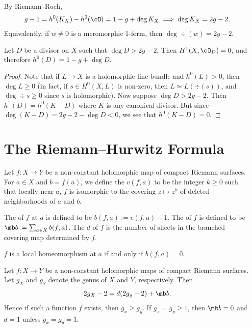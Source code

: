 \documentclass[11pt]{report}
\begin{document}
\begin{cor} \label{cor:deg-1-form-is-2g-2}
By Riemann--Roch,
\[
g-1 = h^0(K_X)-h^0(\cO) = 1-g + \deg K_X \implies \deg K_X = 2g-2,
\]
Equivalently, if $w \neq 0$ is a meromorphic 1-form, then $\deg \div(w)=2g-2$.
\end{cor}

\begin{thm} \label{thm:vanishing-thm}
Let $D$ be a divisor on $X$ such that $\deg D > 2g-2$. Then $H^1(X,\cO_D)=0$, and therefore $h^0(D)=1-g+\deg D$.
\end{thm}

\begin{proof}
Note that if $L \to X$ is a holomorphic line bundle and $h^0(L)>0$, then $\deg L \geq 0$ (in fact, if $s \in H^0(X,L)$ is non-zero, then $L \simeq L(\div(s))$, and $\deg \div s \geq 0$ since $s$ is holomorphic). Now suppose $\deg D > 2g-2$. Then $h^1(D)=h^0(K-D)$ where $K$ is any canonical divisor. But since $\deg (K-D)=2g-2 -\deg D <0$, we see that $h^0(K-D)=0$.
\end{proof}

\section{The Riemann--Hurwitz Formula}

\begin{defn}
Let $f:X \to Y$ be a non-constant holomorphic map of compact Riemann surfaces. For $a \in X$ and $b=f(a)$, we define the  $v(f,a)$ to be the integer $k \geq 0$ such that locally near $a$, $f$ is isomorphic to the covering $z \mapsto z^k$ of deleted neighborhoods of $a$ and $b$.

The  of $f$ at $a$ is defined to be $b(f,a):=v(f,a)-1$. The  of $f$ is defined to be $\mb b := \sum_{a \in X}b(f,a)$. The  $d$ of $f$ is the number of sheets in the branched covering map determined by $f$.
\end{defn}

\begin{rmk}
$f$ is a local homeomorphism at $a$ if and only if $b(f,a)=0$.
\end{rmk}

\begin{thm} \label{thm:riemann-hurwitz}
Let $f:X \to Y$ be a non-constant holomorphic maps of compact Riemann surfaces. Let $g_X$ and $g_Y$ denote the genus of $X$ and $Y$, respectively. Then
\[
2g_X - 2 =d(2g_y - 2)+ \mb b.
\]
Hence if such a function $f$ exists, then $g_x \geq g_y$. If $g_x=g_y\geq 1$, then $\mb b =0$ and $d = 1$ unless $g_x=g_y=1$.
\end{thm}
\end{document}
